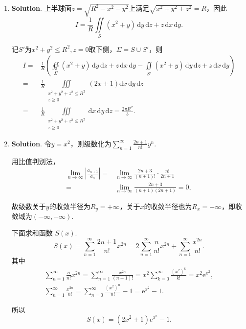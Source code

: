 \documentclass[../Main.tex]{subfiles}
\begin{document}
\begin{enumerate}
  \item \textbf{Solution}. 上半球面$z=\sqrt{R^2-x^2-y^2}$上满足$\sqrt{x^2+y^2+z^2}=R$，因此
        \[
          I=\frac{1}{R}\iint\limits_S \left(x^2+y\right)\,\mathrm{d}y\,\mathrm{d}z+z\,\mathrm{d}x\,\mathrm{d}y.
        \]

        记$S'$为$x^2+y^2\leq R^2,z=0$取下侧，$\Sigma = S\cup S'$，则
        \[
          \begin{aligned}
            I= & \frac{1}{R}\left(\oiint\limits_{\Sigma}\left(x^2+y\right)\,\mathrm{d}y\,\mathrm{d}z+z\,\mathrm{d}x\,\mathrm{d}y-\iint\limits_{S'}\left(x^2+y\right)\,\mathrm{d}y\,\mathrm{d}z+z\,\mathrm{d}x\,\mathrm{d}y\right) \\
            =  & \frac{1}{R}\iiint\limits_{\substack{x^2+y^2+z^2\leq R^2\\z\geq0}}(2x+1) \mathrm{d}x\,\mathrm{d}y\,\mathrm{d}z                                                                                                    \\
            =  & \frac{1}{R}\iiint\limits_{\substack{x^2+y^2+z^2\leq R^2\\z\geq0}}\mathrm{d}x\,\mathrm{d}y\,\mathrm{d}z = \frac{2\pi R^2}{3}.
          \end{aligned}
        \]

  \item \textbf{Solution}. 令$y=x^2$，则级数化为$\sum_{n=1}^{\infty}\frac{2n+1}{n!}y^n$.

        用比值判别法，
        \[
          \begin{aligned}
            \lim_{n\to\infty}\left|\frac{a_{n+1}}{a_n}\right|= & \lim_{n\to\infty}\frac{2n+3}{(n+1)!}\cdot\frac{n!}{2n+1} \\
            =                                                  & \lim_{n\to\infty}\frac{2n+3}{(n+1)(2n+1)}=0,
          \end{aligned}
        \]

        故级数关于$y$的收敛半径为$R_{y}=+\infty$，关于$x$的收敛半径也为$R_x=+\infty$，即收敛域为$(-\infty,+\infty)$.

        下面求和函数 $S(x)$.
        \[
          S(x)=\sum_{n=1}^{\infty}\frac{2n+1}{n!}x^{2n}
          =2\sum_{n=1}^{\infty}\frac{n}{n!}x^{2n}+\sum_{n=1}^{\infty}\frac{x^{2n}}{n!}.
        \]
        其中
        \[
          \begin{gathered}
            \sum_{n=1}^{\infty}\frac{n}{n!}x^{2n}=\sum_{n=1}^{\infty}\frac{x^{2n}}{(n-1)!}=x^2\sum_{k=0}^{\infty}\frac{\left(x^{2}\right)^{k}}{k!}=x^2\mathrm{e}^{x^2},\\
            \sum_{n=1}^{\infty}\frac{x^{2n}}{n!}=\sum_{n=0}^{\infty}\frac{\left(x^{2}\right)^{n}}{n!}-1=\mathrm{e}^{x^2}-1.
          \end{gathered}
        \]

        所以
        \[
          S(x)=(2x^2+1)e^{x^2}-1.
        \]
\end{enumerate}
\end{document}

